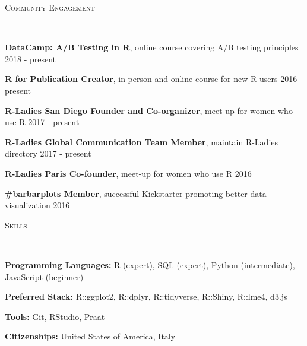 \documentclass[9pt]{article}
\newenvironment{changemargin}[2]{%
  \begin{list}{}{%
    \setlength{\topsep}{0pt}%
    \setlength{\leftmargin}{#1}%
    \setlength{\rightmargin}{#2}%
    \setlength{\listparindent}{\parindent}%
    \setlength{\itemindent}{\parindent}%
    \setlength{\parsep}{\parskip}%
  }%
  \item[]}{\end{list}
}
\newcommand{\lineover}{
	\begin{changemargin}{-0.05in}{-0.05in}
		\vspace*{-8pt}
		\hrulefill \\
		\vspace*{-2pt}
	\end{changemargin}
}
\newcommand{\header}[1]{
	\begin{changemargin}{-0.5in}{-0.5in}
		\scshape{#1}\\
  	\lineover
	\end{changemargin}
}
\newenvironment{body} {
	\vspace*{-16pt}
	\begin{changemargin}{-0.25in}{-0.5in}
  }	
	{\end{changemargin}
}
\begin{document}
\smallskip


\header{\color{red}Community Engagement}

\begin{body}
	\vspace{14pt}
	
	\textbf{DataCamp: A/B Testing in R}, online course covering A/B testing principles \hfill 2018 - present\\
	\medskip
	
	\textbf{R for Publication Creator}, in-person and online course for new R users \hfill 2016 - present\\
	\medskip
	
	\textbf{R-Ladies San Diego Founder and Co-organizer}, meet-up for women who use R \hfill 2017 - present\\
	\medskip
	
	\textbf{R-Ladies Global Communication Team Member}, maintain R-Ladies directory \hfill 2017 - present\\
	\medskip
	
	\textbf{R-Ladies Paris Co-founder}, meet-up for women who use R \hfill 2016\\
	\medskip

	\textbf{\#barbarplots Member}, successful Kickstarter promoting better data visualization \hfill 2016\\
	\medskip
		
\end{body}

\smallskip

\header{\color{red}Skills}

\begin{body}
	\vspace{14pt}
	
	
	\textbf{Programming Languages:} R (expert), SQL (expert), Python (intermediate), JavaScript (beginner)\
	\medskip

	\textbf{Preferred Stack:} R::ggplot2, R::dplyr, R::tidyverse, R::Shiny, R::lme4, d3.js\\
	\medskip
	
	\textbf{Tools:} Git, RStudio, Praat
	\medskip
	
	\textbf{Citizenships:} United States of America, Italy\\
	\medskip

\end{body}
\end{document}
